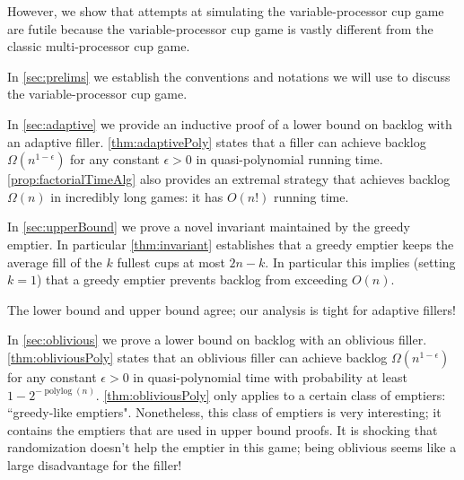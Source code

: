 \documentclass[twocolumn]{article}[10pt]
\renewcommand{\paragraph}[1]{\vspace{0.09in}\noindent{\bf \boldmath #1.}}
\DeclareMathOperator{\polylog}{\text{polylog}}
\begin{document}
However, we show that attempts at simulating the variable-processor cup
game are futile because the variable-processor cup game
is vastly different from the classic multi-processor cup game. 

\paragraph{Outline and Results}
In \cref{sec:prelims} we establish the conventions and
notations we will use to discuss the variable-processor cup game. 

In \cref{sec:adaptive} we provide an inductive proof of a
lower bound on backlog with an adaptive filler.
\cref{thm:adaptivePoly} states that a filler can achieve backlog
$\Omega(n^{1-\epsilon})$ for any constant $\epsilon > 0$ in
quasi-polynomial running time. \cref{prop:factorialTimeAlg} also provides an extremal strategy
that achieves backlog $\Omega(n)$ in incredibly long games: it
has $O(n!)$ running time.

In \cref{sec:upperBound} we prove a novel invariant maintained
by the greedy emptier. In particular \cref{thm:invariant} establishes
that a greedy emptier keeps the average fill of the $k$ fullest cups at most
$2n-k$. In particular this implies (setting $k=1$) that a greedy emptier
prevents backlog from exceeding $O(n)$. 

The lower bound and upper bound agree; our analysis is tight for adaptive fillers!

In \cref{sec:oblivious} we prove a lower bound on backlog with an oblivious filler. 
\cref{thm:obliviousPoly} states that an oblivious filler can achieve
backlog $\Omega(n^{1-\epsilon})$ for any constant $\epsilon > 0$ in
quasi-polynomial time with probability at least $1-2^{-\polylog(n)}$.
\cref{thm:obliviousPoly} only applies to a certain class of emptiers:
``greedy-like emptiers". Nonetheless, this class of emptiers is very
interesting; it contains the emptiers that are used in upper bound proofs.
It is shocking that randomization doesn't help the emptier in this game;
being oblivious seems like a large disadvantage for the filler!
\end{document}
